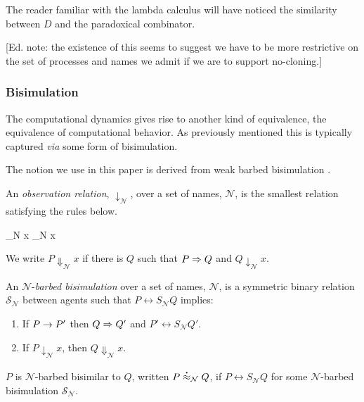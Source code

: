 \begin{remark}\label{rem:paradoxical_combinator}
  The reader familiar with the lambda calculus will have noticed the
  similarity between $D$ and the paradoxical combinator.

  [Ed. note: the existence of this seems to suggest we have to be more
  restrictive on the set of processes and names we admit if we are to
  support no-cloning.]
\end{remark}

\subsubsection{Bisimulation}

The computational dynamics gives rise to another kind of equivalence,
the equivalence of computational behavior. As previously mentioned
this is typically captured \emph{via} some form of bisimulation.


The notion we use in this paper is derived from weak barbed
bisimulation \cite{milner91polyadicpi}. 

\begin{definition}
An \emph{observation relation}, $\downarrow_{\mathcal N}$, over a set
of names, $\mathcal N$, is the smallest relation satisfying the rules
below.

		  { \downarrow_{\mathcal N} x}
		  { \downarrow_{\mathcal N} x}

We write $P \Downarrow_{\mathcal N} x$ if there is $Q$ such that 
$P \Rightarrow Q$ and $Q \downarrow_{\mathcal N} x$.
\end{definition}

\begin{definition}
An  ${\mathcal N}$-\emph{barbed bisimulation} over a set of names, ${\mathcal N}$, is a symmetric binary relation 
${\mathcal S}_{\mathcal N}$ between agents such that $P\rel{S}_{\mathcal N}Q$ implies:
\begin{enumerate}
\item If $P \rightarrow P'$ then $Q \Rightarrow Q'$ and $P'\rel{S}_{\mathcal N} Q'$.
\item If $P\downarrow_{\mathcal N} x$, then $Q\Downarrow_{\mathcal N} x$.
\end{enumerate}
$P$ is ${\mathcal N}$-barbed bisimilar to $Q$, written
$P \stackrel{\centerdot}{\approx}_{\mathcal N} Q$, if $P \rel{S}_{\mathcal N} Q$ for some ${\mathcal N}$-barbed bisimulation ${\mathcal S}_{\mathcal N}$.
\end{definition}

